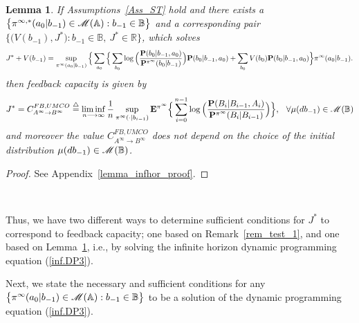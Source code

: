 \documentclass[11pt, a4paper, journal,onecolumn]{IEEEtran}
\newcommand{\mb}{\mathbb}
\newcommand{\sr}{\stackrel}
\newcommand{\rar}{\rightarrow}
\newcommand{\tri}{\sr{\triangle}{=}}
\newcommand{\hso}{\hspace{.1in}}
\newtheorem{lemma}{Lemma}[section]
\begin{document}
\begin{lemma}\label{lemma_infhor}
If Assumptions~\ref{Ass_ST} hold and there exists a $\big\{\pi^{\infty,*}(a_0|b_{-1}) \in {\cal M}({\mb A}): b_{-1}  \in {\mb B}\big\}$ and a corresponding pair $\Big\{\Big(V(b_{-1}), J^*\Big): b_{-1} \in {\mb B}, \ J^*\in \mathbb{R}\Big\}$, which solves 
\begin{align}
J^*+V(b_{-1})= \sup_{\pi^\infty(a_0|b_{-1})}\Big\{\sum_{a_0}\Big\{\sum_{b_0}\log\Big(\frac{{\bf P}(b_0|b_{-1},a_0)}{{\bf P}^{\pi^\infty}(b_0|b_{-1})}\Big){\bf P}(b_0|b_{-1},a_0) 
+\sum_{b_0}V(b_0){\bf P}(b_0|b_{-1},a_0)\Big\}\pi^\infty(a_0|b_{-1}). \label{inf.DP3}
\end{align}
 then feedback capacity is given by
\begin{align}
J^* =  C_{A^\infty\rar B^\infty}^{FB, UMCO}\tri \liminf_{n\longrightarrow \infty}\frac{1}{n}\sup_{\pi^\infty(\cdot|b_{i-1})} {\bf E}^{\pi^{\infty}}\Big\{\sum_{i=0}^{n-1}\log\Big(\frac{{\bf P}(B_i|B_{i-1},A_i)}{{\bf P}^{\pi^{\infty}}(B_i|B_{i-1})}\Big)\Big\}, \hso \forall \mu(db_{-1}) \in {\cal M}({\mb B}) \label{min_a_c}
\end{align}
and moreover the value $C_{A^\infty\rar B^\infty}^{FB, UMCO}$ does not depend on the choice of the initial distribution  $\mu(db_{-1}) \in {\cal M}({\mb B})$.
\end{lemma}
\begin{proof}
See Appendix~\ref{lemma_infhor_proof}.
\end{proof}


\ \

Thus, we have two different ways to determine sufficient conditions for $J^*$ to correspond to feedback capacity; one based on Remark~\ref{rem_test_1}, and one based on Lemma~\ref{lemma_infhor}, i.e., by solving the infinite horizon dynamic programming equation (\ref{inf.DP3}).


Next, we state the necessary and sufficient conditions for any $\big\{\pi^{\infty}(a_0|b_{-1}) \in {\cal M}({\mb A}): b_{-1}  \in {\mb B}\big\}$ to be a solution of the dynamic programming equation (\ref{inf.DP3}).\\
\end{document}
